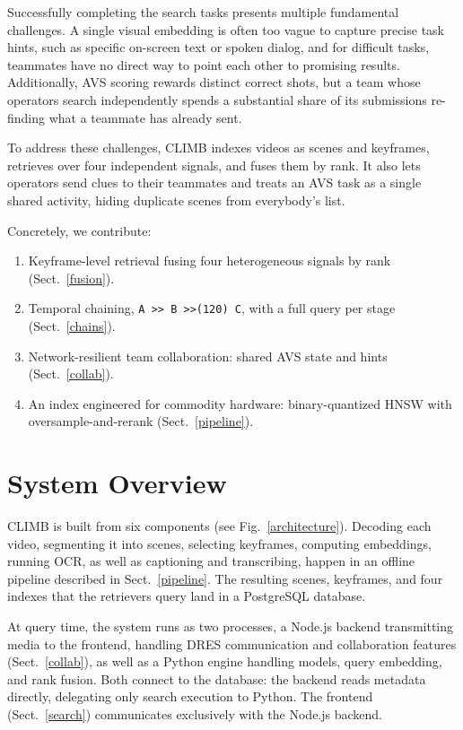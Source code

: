 \documentclass{llncs}
\newcommand{\q}[1]{\texttt{\small #1}}
\newcommand{\tchain}{>{}>}
\begin{document}
Successfully completing the search tasks presents multiple fundamental challenges. A single visual embedding is often 
too vague to capture precise task hints, such as specific on-screen text or spoken dialog, and for 
difficult tasks, teammates have no direct way to point each other to promising results.
Additionally, AVS scoring rewards distinct correct shots, but a team whose operators search independently
spends a substantial share of its submissions re-finding what a teammate has already sent.

To address these challenges, CLIMB indexes videos as scenes and keyframes, retrieves over four independent signals,
and fuses them by rank. It also lets operators send clues to their teammates and treats an AVS task as a single shared activity,
hiding duplicate scenes from everybody's list.

\newpage
Concretely, we contribute:
\begin{enumerate}
    \item Keyframe-level retrieval fusing four heterogeneous signals by rank (Sect.~\ref{fusion}).
    \item Temporal chaining, \q{A \tchain{} B \tchain{}(120) C}, with a full query per stage (Sect.~\ref{chains}).
    \item Network-resilient team collaboration: shared AVS state and hints (Sect.~\ref{collab}).
    \item An index engineered for commodity hardware: binary-quantized HNSW with oversample-and-rerank (Sect.~\ref{pipeline}).
\end{enumerate}


\section{System Overview}
CLIMB is built from six components (see Fig.~\ref{architecture}). Decoding each video, segmenting it into scenes, selecting keyframes, 
computing embeddings, running OCR, as well as captioning and transcribing, happen in an offline pipeline described in 
Sect.~\ref{pipeline}. The resulting scenes, keyframes, and four indexes that the retrievers query land in a PostgreSQL database.

At query time, the system runs as two processes, a Node.js backend transmitting media to the frontend, handling DRES \cite{dres,dres2} communication and collaboration features (Sect.~\ref{collab}),
as well as a Python engine handling models, query embedding, and rank fusion. Both connect to the database: the backend reads metadata directly, delegating 
only search execution to Python. The frontend (Sect.~\ref{search}) communicates exclusively with the Node.js backend.
\end{document}
